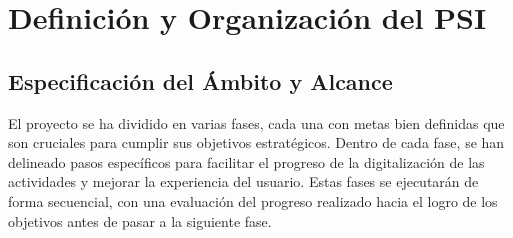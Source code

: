 \section{Definición y Organización del PSI}
\subsection{Especificación del Ámbito y Alcance}
El proyecto se ha dividido en varias fases, cada una con metas bien definidas que son cruciales para cumplir sus objetivos estratégicos. Dentro de cada fase, se han delineado pasos específicos para facilitar el progreso de la digitalización de las actividades y mejorar la experiencia del usuario. Estas fases se ejecutarán de forma secuencial, con una evaluación del progreso realizado hacia el logro de los objetivos antes de pasar a la siguiente fase.
